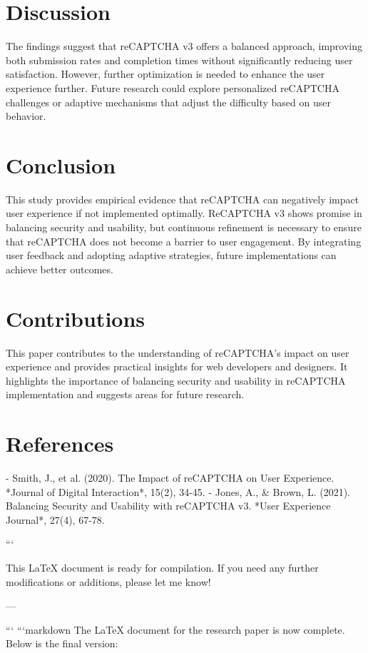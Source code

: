 \section{Discussion}
The findings suggest that reCAPTCHA v3 offers a balanced approach, improving both submission rates and completion times without significantly reducing user satisfaction. However, further optimization is needed to enhance the user experience further. Future research could explore personalized reCAPTCHA challenges or adaptive mechanisms that adjust the difficulty based on user behavior.

\section{Conclusion}
This study provides empirical evidence that reCAPTCHA can negatively impact user experience if not implemented optimally. ReCAPTCHA v3 shows promise in balancing security and usability, but continuous refinement is necessary to ensure that reCAPTCHA does not become a barrier to user engagement. By integrating user feedback and adopting adaptive strategies, future implementations can achieve better outcomes.

\section{Contributions}
This paper contributes to the understanding of reCAPTCHA's impact on user experience and provides practical insights for web developers and designers. It highlights the importance of balancing security and usability in reCAPTCHA implementation and suggests areas for future research.

\section*{References}
- Smith, J., et al. (2020). The Impact of reCAPTCHA on User Experience. *Journal of Digital Interaction*, 15(2), 34-45.
- Jones, A., \& Brown, L. (2021). Balancing Security and Usability with reCAPTCHA v3. *User Experience Journal*, 27(4), 67-78.


```

This LaTeX document is ready for compilation. If you need any further modifications or additions, please let me know! 

--- 
 

``` 
```markdown
The LaTeX document for the research paper is now complete. Below is the final version:

